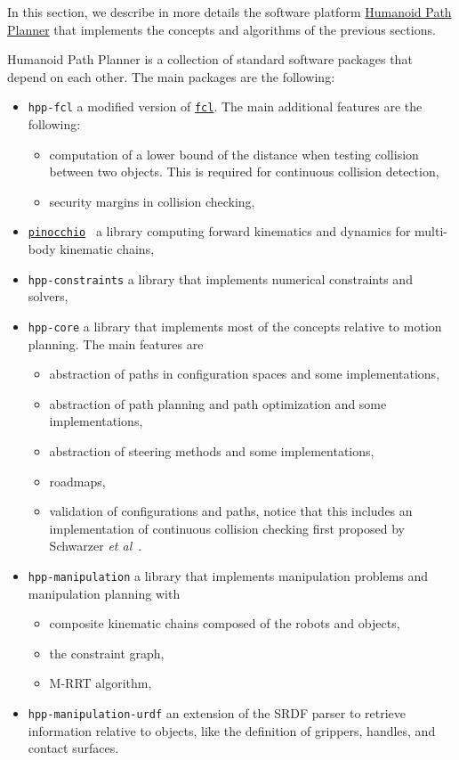 In this section, we describe in more details the software platform
\href{https://humanoid-path-planner.github.io/hpp-doc}{Humanoid Path
  Planner} that implements the concepts and algorithms of the previous
sections.

Humanoid Path Planner is a collection of standard software packages that depend
on each other. The main packages are the following:
\begin{itemize}
\item \texttt{hpp-fcl} a modified version of \href{https://github.com/flexible-collision-library/fcl}{\texttt{fcl}}. The main additional features are the following:
  \begin{itemize}
  \item computation of a lower bound of the distance when testing collision
    between two objects. This is required for continuous collision detection,
  \item security margins in collision checking,
  \end{itemize}
\item \href{https://stack-of-tasks.github.io/pinocchio}{\texttt{pinocchio}}~\cite{pinocchio} a library computing forward kinematics and dynamics for multi-body kinematic chains,
\item \texttt{hpp-constraints} a library that implements numerical constraints
  and solvers,
\item \texttt{hpp-core} a library that implements most of the concepts relative
  to motion planning. The main features are
  \begin{itemize}
  \item abstraction of paths in configuration spaces and some implementations,
  \item abstraction of path planning and path optimization and some implementations,
  \item abstraction of steering methods and some implementations,
  \item roadmaps,
  \item validation of configurations and paths, {\color{blue} notice that this
    includes an implementation of continuous collision checking first proposed
    by Schwarzer \textit{et al}~\cite{SchSahLat2004}.}
  \end{itemize}
\item \texttt{hpp-manipulation} a library that implements manipulation
  problems and manipulation planning with
  \begin{itemize}
    \item composite kinematic chains composed of the robots and objects,
    \item the constraint graph,
    \item M-RRT algorithm,
  \end{itemize}
\item \texttt{hpp-manipulation-urdf} an extension of the SRDF parser to retrieve
  information relative to objects, like the definition of grippers, handles, and
  contact surfaces.
\end{itemize}
